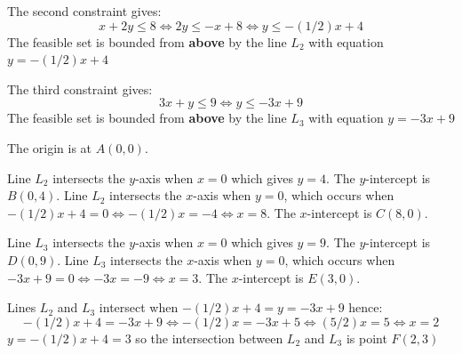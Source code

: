 \documentclass{article}
\begin{document}
The second constraint gives:
\[x + 2y \leq 8 \iff 2y \leq -x + 8 \iff y \leq -(1/2)x + 4\]
The feasible set is bounded from {\bf above} by the line \(L_2\) with equation \(y = -(1/2)x + 4\)

\vspace{5mm}

The third constraint gives:
\[3x + y \leq 9 \iff y \leq -3x + 9\]
The feasible set is bounded from {\bf above} by the line \(L_3\) with equation \(y = -3x + 9\)

\vspace{5mm}

The origin is at \(A(0,0)\). 

\vspace{5mm}

Line \(L_2\) intersects the \(y\)-axis when \(x = 0\) which gives \(y = 4\). The \(y\)-intercept is \(B(0,4)\). Line \(L_2\) intersects the \(x\)-axis when \(y = 0\), which occurs when \(-(1/2)x + 4 = 0 \iff -(1/2)x = -4 \iff x = 8\). The \(x\)-intercept is \(C(8,0)\).

\vspace{5mm}

Line \(L_3\) intersects the \(y\)-axis when \(x = 0\) which gives \(y = 9\). The \(y\)-intercept is \(D(0,9)\). Line \(L_3\) intersects the \(x\)-axis when \(y = 0\), which occurs when \(-3x + 9 = 0 \iff -3x = -9 \iff x = 3\). The \(x\)-intercept is \(E(3,0)\).

\vspace{5mm}

Lines \(L_2\) and \(L_3\) intersect when \(-(1/2)x + 4 = y = -3x + 9\) hence:
\[-(1/2)x + 4 = -3x + 9 \iff -(1/2)x = -3x + 5 \iff (5/2)x = 5 \iff x = 2\]
\(y = -(1/2)x + 4 = 3\) so the intersection between \(L_2\) and \(L_3\) is point \(F(2,3)\)

\vspace{5mm}
\end{document}
